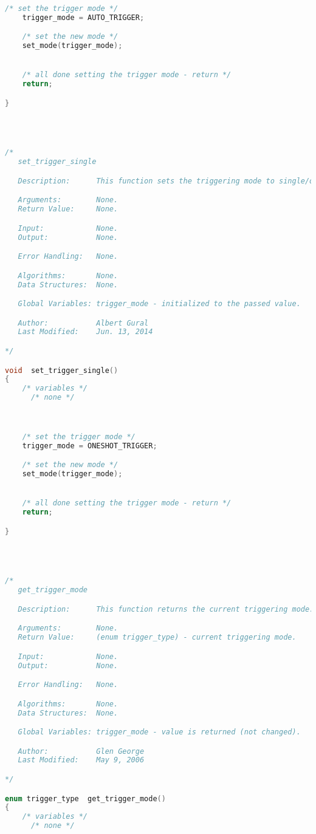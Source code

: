 \begin{lstlisting}[language=C]
    /* set the trigger mode */
    trigger_mode = AUTO_TRIGGER;

    /* set the new mode */
    set_mode(trigger_mode);


    /* all done setting the trigger mode - return */
    return;

}




/*
   set_trigger_single

   Description:      This function sets the triggering mode to single/one-shot.

   Arguments:        None.
   Return Value:     None.

   Input:            None.
   Output:           None.

   Error Handling:   None.

   Algorithms:       None.
   Data Structures:  None.

   Global Variables: trigger_mode - initialized to the passed value.

   Author:           Albert Gural
   Last Modified:    Jun. 13, 2014

*/

void  set_trigger_single()
{
    /* variables */
      /* none */



    /* set the trigger mode */
    trigger_mode = ONESHOT_TRIGGER;

    /* set the new mode */
    set_mode(trigger_mode);


    /* all done setting the trigger mode - return */
    return;

}




/*
   get_trigger_mode

   Description:      This function returns the current triggering mode.

   Arguments:        None.
   Return Value:     (enum trigger_type) - current triggering mode.

   Input:            None.
   Output:           None.

   Error Handling:   None.

   Algorithms:       None.
   Data Structures:  None.

   Global Variables: trigger_mode - value is returned (not changed).

   Author:           Glen George
   Last Modified:    May 9, 2006

*/

enum trigger_type  get_trigger_mode()
{
    /* variables */
      /* none */




\end{lstlisting}
